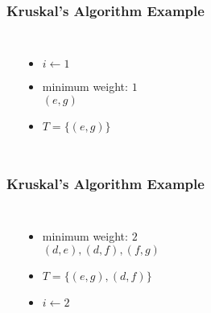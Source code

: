 \documentclass[dvipsnames]{beamer}
\begin{document}
\begin{frame}
  \frametitle{Kruskal's Algorithm Example}

  \begin{example}[initialization]
    \begin{columns}
      \begin{center}
      \end{center}

      \pause
      \begin{itemize}
        \item $i \leftarrow 1$
        \item minimum weight: $1$\\
          $(e,g)$

        \pause
        \item $T = \{ (e,g) \}$
      \end{itemize}
    \end{columns}
  \end{example}
\end{frame}

\begin{frame}
  \frametitle{Kruskal's Algorithm Example}

  \begin{example}[$1 < 6$]
    \begin{columns}
      \begin{center}
      \end{center}

      \pause
      \begin{itemize}
        \item minimum weight: $2$\\
          $(d,e), (d,f), (f,g)$

        \pause
        \item $T = \{ (e,g), (d,f) \}$
        \item $i \leftarrow 2$
      \end{itemize}
    \end{columns}
  \end{example}
\end{frame}
\end{document}
